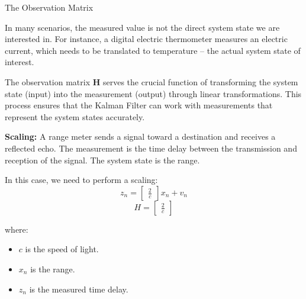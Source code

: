\begin{frame}{The Observation Matrix}

In many scenarios, the measured value is not the direct system state we are interested in. For instance, a digital electric thermometer measures an electric current, which needs to be translated to temperature -- the actual system state of interest.

\vspace{5pt}
The observation matrix $\mathbf{H}$ serves the crucial function of transforming the system state (input) into the measurement (output) through linear transformations. This process ensures that the Kalman Filter can work with measurements that represent the system states accurately.

\vspace{5pt}
\textbf{Scaling:} A range meter sends a signal toward a destination and receives a reflected echo. The
measurement is the time delay between the transmission and reception of the signal. The system state is the range.

In this case, we need to perform a scaling:
\begin{equation*}
z_n = \begin{bmatrix} \frac{2}{c} \end{bmatrix} x_n + v_n
\end{equation*}
\begin{equation*}
H = \begin{bmatrix} \frac{2}{c} \end{bmatrix}
\end{equation*}

where:
\begin{itemize}
    \item \(c\) is the speed of light.
    \item \(x_n\) is the range.
    \item \(z_n\) is the measured time delay.
\end{itemize}

\end{frame}

